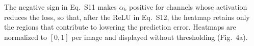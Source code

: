 The negative sign in Eq.~S11 makes $\alpha_k$ positive for channels whose activation reduces the loss, so that, after the ReLU in Eq.~S12, the heatmap retains only the regions that contribute to lowering the prediction error. Heatmaps are normalized to $[0, 1]$ per image and displayed without thresholding (Fig.~4a).
